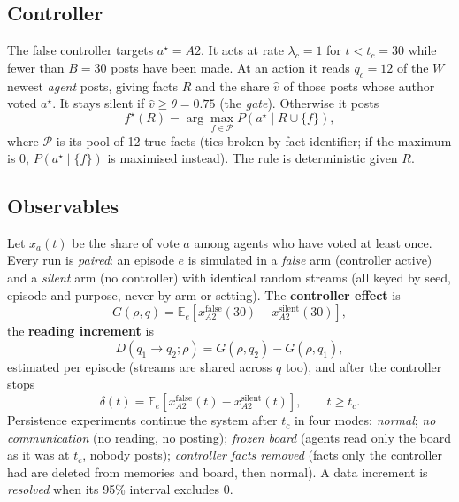 \documentclass[10pt,a4paper]{article}
\newcommand{\E}{\mathbb{E}}
\newcommand{\Pool}{\mathcal{P}}
\begin{document}
\subsection{Controller}
The false controller targets $a^\star=A2$. It acts at rate $\lambda_c=1$ for $t<t_c=30$ while fewer than $B=30$ posts
have been made. At an action it reads $q_c=12$ of the $W$ newest \emph{agent} posts, giving facts $R$ and the share
$\hat v$ of those posts whose author voted $a^\star$. It stays silent if $\hat v\ge\theta=0.75$ (the \emph{gate}).
Otherwise it posts
\begin{equation}
  f^\star(R)=\arg\max_{f\in\Pool}P(a^\star\mid R\cup\{f\}),\label{eq:controller}
\end{equation}
where $\Pool$ is its pool of 12 true facts (ties broken by fact identifier; if the maximum is 0, $P(a^\star\mid\{f\})$
is maximised instead). The rule is deterministic given $R$.

\subsection{Observables}
Let $x_a(t)$ be the share of vote $a$ among agents who have voted at least once. Every run is \emph{paired}: an episode
$e$ is simulated in a \emph{false} arm (controller active) and a \emph{silent} arm (no controller) with identical random
streams (all keyed by seed, episode and purpose, never by arm or setting). The \textbf{controller effect} is
\begin{equation}
  G(\rho,q)=\E_e\!\left[x_{A2}^{\text{false}}(30)-x_{A2}^{\text{silent}}(30)\right],\label{eq:G}
\end{equation}
the \textbf{reading increment} is
\begin{equation}
  D(q_1\!\to\!q_2;\rho)=G(\rho,q_2)-G(\rho,q_1),\label{eq:D}
\end{equation}
estimated per episode (streams are shared across $q$ too), and after the controller stops
\begin{equation}
  \delta(t)=\E_e\!\left[x_{A2}^{\text{false}}(t)-x_{A2}^{\text{silent}}(t)\right],\qquad t\ge t_c .\label{eq:delta}
\end{equation}
Persistence experiments continue the system after $t_c$ in four modes: \emph{normal}; \emph{no communication} (no
reading, no posting); \emph{frozen board} (agents read only the board as it was at $t_c$, nobody posts); \emph{controller
facts removed} (facts only the controller had are deleted from memories and board, then normal). A data increment is
\emph{resolved} when its 95\% interval excludes 0.
\end{document}
